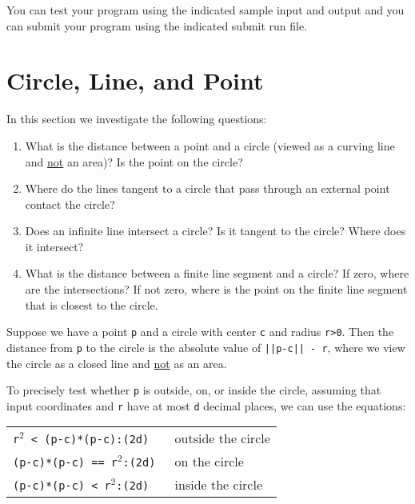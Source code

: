 \documentclass[12pt]{article}
\begin{document}
You can test your program using the indicated sample input and
output and you can submit your program using the indicated submit
run file.

\newpage


\section{Circle, Line, and Point}
In this section we investigate the following questions:
\begin{enumerate}
\item What is the distance between a point and a circle (viewed as
a curving line and \underline{not} an area)?
Is the point on the circle?
\item Where do the lines tangent to a circle that pass through
an external point contact the
circle?
\item Does an infinite line intersect a circle?  Is it
tangent to the circle?  Where does it intersect?
\item What is the distance between a finite line segment and
a circle?  If zero, where are the intersections?  If not zero,
where is the point on the finite line segment that is closest to the
circle.
\end{enumerate}

Suppose we have a point {\tt p} and a circle with center {\tt c}
and radius {\tt r>0}.  Then the distance from {\tt p} to the circle
is the absolute value of {\tt ||p-c|| - r},
where we view the circle as a closed line
and \underline{not} as an area.

To precisely test whether {\tt p} is outside, on, or inside the
circle, assuming that input coordinates and {\tt r} have at most
{\tt d} decimal places, we can use the equations:
\begin{center}
\begin{tabular}{l@{~~~~~}l}
\tt r$^2$ < (p-c)*(p-c):(2d) & outside the circle \\
\tt (p-c)*(p-c) == r$^2$:(2d) & on the circle \\
\tt (p-c)*(p-c) < r$^2$:(2d) & inside the circle \\
\end{tabular}
\end{center}
\end{document}
